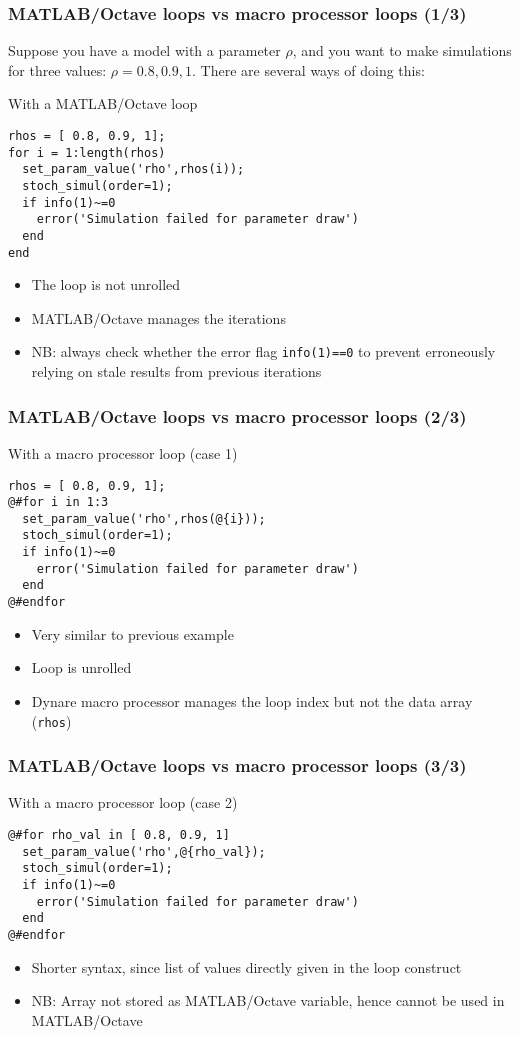 \documentclass[aspectratio=169]{beamer}
\begin{document}
\begin{frame}[fragile=singleslide]
  \frametitle{MATLAB/Octave loops vs macro processor loops (1/3)}
  Suppose you have a model with a parameter $\rho$, and you want to make
  simulations for three values: $\rho = 0.8, 0.9, 1$. There are
  several ways of doing this:
  \begin{block}{With a MATLAB/Octave loop}
\begin{verbatim}
rhos = [ 0.8, 0.9, 1];
for i = 1:length(rhos)
  set_param_value('rho',rhos(i));
  stoch_simul(order=1);
  if info(1)~=0
    error('Simulation failed for parameter draw')
  end
end
\end{verbatim}
  \end{block}
  \begin{itemize}
  \item The loop is not unrolled
  \item MATLAB/Octave manages the iterations
  \item NB: always check whether the error flag \texttt{info(1)==0} to prevent erroneously relying on stale results from previous iterations
  \end{itemize}
\end{frame}

\begin{frame}[fragile=singleslide]
  \frametitle{MATLAB/Octave loops vs macro processor loops (2/3)}
  \begin{block}{With a macro processor loop (case 1)}
\begin{verbatim}
rhos = [ 0.8, 0.9, 1];
@#for i in 1:3
  set_param_value('rho',rhos(@{i}));
  stoch_simul(order=1);
  if info(1)~=0
    error('Simulation failed for parameter draw')
  end
@#endfor
\end{verbatim}
  \end{block}
  \begin{itemize}
  \item Very similar to previous example
  \item Loop is unrolled
  \item Dynare macro processor manages the loop index but not the data array (\texttt{rhos})
  \end{itemize}
\end{frame}

\begin{frame}[fragile=singleslide]
  \frametitle{MATLAB/Octave loops vs macro processor loops (3/3)}
  \begin{block}{With a macro processor loop (case 2)}
\begin{verbatim}
@#for rho_val in [ 0.8, 0.9, 1]
  set_param_value('rho',@{rho_val});
  stoch_simul(order=1);
  if info(1)~=0
    error('Simulation failed for parameter draw')
  end
@#endfor
\end{verbatim}
  \end{block}
  \begin{itemize}
  \item Shorter syntax, since list of values directly given in the loop construct
  \item NB: Array not stored as MATLAB/Octave variable, hence cannot be used in MATLAB/Octave
  \end{itemize}
\end{frame}
\end{document}

